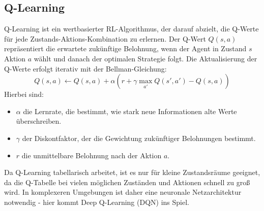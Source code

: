 \subsection{Q-Learning}
Q-Learning ist ein wertbasierter RL-Algorithmus, der darauf abzielt, die Q-Werte 
für jede Zustands-Aktions-Kombination zu erlernen. Der Q-Wert $Q(s,a)$ repräsentiert 
die erwartete zukünftige Belohnung, wenn der Agent in Zustand $s$ Aktion $a$ wählt 
und danach der optimalen Strategie folgt.
Die Aktualisierung der Q-Werte erfolgt iterativ mit der Bellman-Gleichung:
\begin{equation}
    Q(s,a) \leftarrow Q(s,a) + \alpha (r + \gamma \max_{a'}Q(s',a') - Q(s,a))
\end{equation}
Hierbei sind:
\begin{itemize}
    \item $\alpha$ die Lernrate, die bestimmt, wie stark neue Informationen alte Werte überschreiben.
    \item $\gamma$ der Diskontfaktor, der die Gewichtung zukünftiger Belohnungen bestimmt.
    \item $r$ die unmittelbare Belohnung nach der Aktion $a$.
\end{itemize}
Da Q-Learning tabellarisch arbeitet, ist es nur für kleine Zustandsräume geeignet, 
da die Q-Tabelle bei vielen möglichen Zuständen und Aktionen schnell zu groß wird. 
In komplexeren Umgebungen ist daher eine neuronale Netzarchitektur notwendig - 
hier kommt Deep Q-Learning (DQN) ins Spiel.


